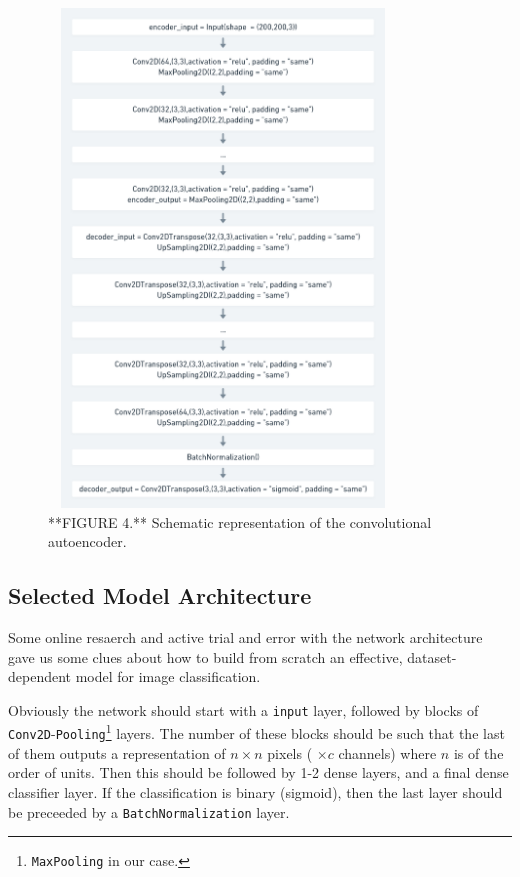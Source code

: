 \documentclass{acm_proc_article-sp}
\begin{document}
\begin{figure}

{\centering \includegraphics[width=350px,height=500]{Images/AEShort} 

}

\caption{**FIGURE 4.** Schematic representation of the convolutional autoencoder.}\label{fig:ae}
\end{figure}

\hypertarget{model-architecture}{%
\subsection{Selected Model Architecture}\label{model-architecture}}

Some online resaerch and active trial and error with the network
architecture gave us some clues about how to build from scratch an
effective, dataset-dependent model for image classification.

Obviously the network should start with a \texttt{input} layer, followed
by blocks of \texttt{Conv2D}-\texttt{Pooling}\footnote{\texttt{MaxPooling}
  in our case.} layers. The number of these blocks should be such that
the last of them outputs a representation of \(n \times n\) pixels (
\(\times c\) channels) where \(n\) is of the order of units. Then this
should be followed by 1-2 dense layers, and a final dense classifier
layer. If the classification is binary (sigmoid), then the last layer
should be preceeded by a \texttt{BatchNormalization} layer.
\end{document}
